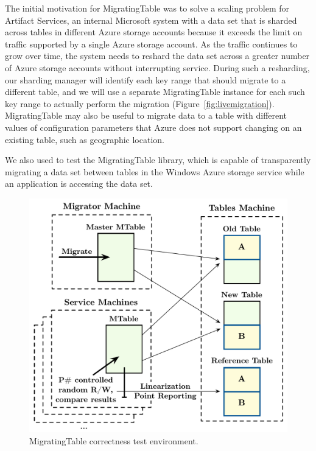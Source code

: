 The initial motivation for MigratingTable was to solve a scaling problem for Artifact Services, an internal Microsoft system with a data set that is sharded across tables in different Azure storage accounts because it exceeds the limit on traffic supported by a single Azure storage account.  As the traffic continues to grow over time, the system needs to reshard the data set across a greater number of Azure storage accounts without interrupting service.  During such a resharding, our sharding manager will identify each key range that should migrate to a different table, and we will use a separate MigratingTable instance for each such key range to actually perform the migration (Figure~\ref{fig:livemigration}).  MigratingTable may also be useful to migrate data to a table with different values of configuration parameters that Azure does not support changing on an existing table, such as geographic location.

\def\term#1{\emph{#1}}
We also used \psharp to test the MigratingTable library, which is capable of transparently migrating a data set between tables in the Windows Azure storage service while an application is accessing the data set.

\begin{figure}[t]
\centering
\includegraphics[width=\linewidth]{img/mocked_migration}
\caption{MigratingTable \psharp correctness test environment.}
\label{fig:mockedmigration}
\end{figure}

